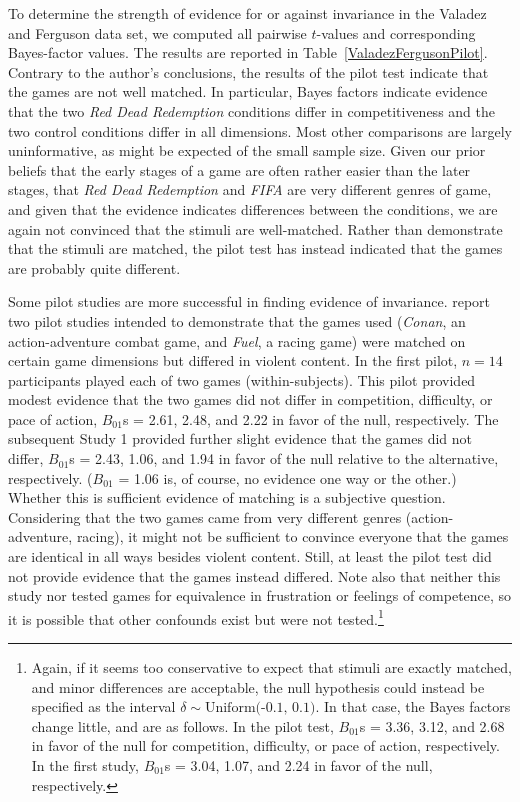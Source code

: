 \documentclass[man]{apa6}
\begin{document}
To determine the strength of evidence for or against invariance in the Valadez and Ferguson data set, we computed all pairwise $t$-values and corresponding Bayes-factor values.  The results are reported in Table~\ref{ValadezFergusonPilot}. Contrary to the author's conclusions, the results of the pilot test indicate that the games are not well matched. In particular, Bayes factors indicate evidence that the two {\em Red Dead Redemption} conditions differ in competitiveness and the two control conditions differ in all dimensions. Most other comparisons are largely uninformative, as might be expected of the small sample size. Given our prior beliefs that the early stages of a game are often rather easier than the later stages, that {\em Red Dead Redemption} and {\em FIFA} are very different genres of game, and given that the evidence indicates differences between the conditions, we are again not convinced that the stimuli are well-matched. Rather than demonstrate that the stimuli are matched, the pilot test has instead indicated that the games are probably quite different.

Some pilot studies are more successful in finding evidence of invariance. \citet{Adachi:Willoughby:2011} report two pilot studies intended to demonstrate that the games used ({\em Conan}, an action-adventure combat game, and {\em Fuel}, a racing game) were matched on certain game dimensions but differed in violent content. In the first pilot, $n = 14$ participants played each of two games (within-subjects). This pilot provided modest evidence that the two games did not differ in competition, difficulty, or pace of action, $B_{01}$s = 2.61, 2.48, and 2.22 in favor of the null, respectively. The subsequent Study 1 provided further slight evidence that the games did not differ, $B_{01}$s = 2.43, 1.06, and 1.94 in favor of the null relative to the alternative, respectively. ($B_{01}$ = 1.06 is, of course, no evidence one way or the other.) Whether this is sufficient evidence of matching is a subjective question. Considering that the two games came from very different genres (action-adventure, racing), it might not be sufficient to convince everyone that the games are identical in all ways besides violent content. Still, at least the pilot test did not provide evidence that the games instead differed. Note also that neither this study nor \citet{Valadez:Ferguson:2012} tested games for equivalence in frustration or feelings of competence, so it is possible that other confounds exist but were not tested.\footnote{Again, if it seems too conservative to expect that stimuli are exactly matched, and minor differences are acceptable, the null hypothesis could instead be specified as the interval $\delta \sim \mbox{Uniform(-0.1, 0.1)}$. In that case, the Bayes factors change little, and are as follows. In the pilot test, $B_{01}$s = 3.36, 3.12, and 2.68 in favor of the null for competition, difficulty, or pace of action, respectively. In the first study, $B_{01}$s = 3.04, 1.07, and 2.24 in favor of the null, respectively.}
\end{document}
